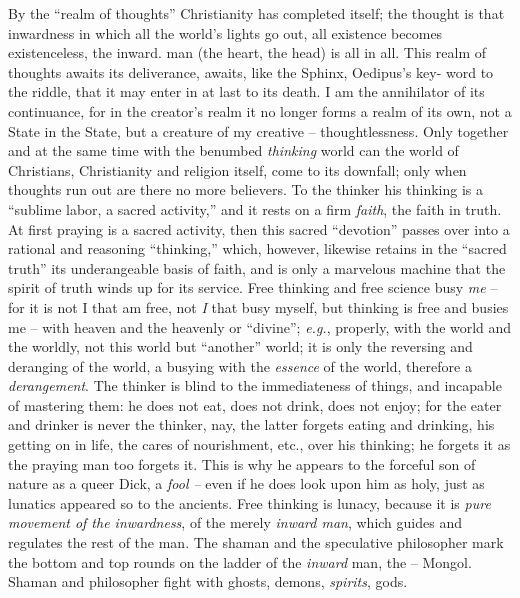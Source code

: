 \documentclass[12pt,a4paper]{book}
\begin{document}
By the ``realm of thoughts'' Christianity has completed itself; the thought 
is that inwardness in which all the world's lights go out, all existence 
becomes existenceless, the inward. man (the heart, the head) is all in all. 
This realm of thoughts awaits its deliverance, awaits, like the Sphinx, 
Oedipus's key- word to the riddle, that it may enter in at last to its death. 
I am the annihilator of its continuance, for in the creator's realm it no 
longer forms a realm of its own, not a State in the State, but a creature of 
my creative -- thoughtlessness. Only together and at the same time with the 
benumbed \textit{thinking} world can the world of Christians, Christianity and 
religion itself, come to its downfall; only when thoughts run out are there no 
more believers. To the thinker his thinking is a ``sublime labor, a sacred 
activity,'' and it rests on a firm \textit{faith}, the faith in truth. At 
first praying is a sacred activity, then this sacred ``devotion'' passes 
over into a rational and reasoning ``thinking,'' which, however, likewise 
retains in the ``sacred truth'' its underangeable basis of faith, and is 
only a marvelous machine that the spirit of truth winds up for its service. 
Free thinking and free science busy \textit{me} -- for it is not I that am 
free, not \textit{I} that busy myself, but thinking is free and busies me -- 
with heaven and the heavenly or ``divine''; \textit{e.g.}, properly, with 
the world and the worldly, not this world but ``another'' world; it is only 
the reversing and deranging of the world, a busying with the \textit{essence} 
of the world, therefore a \textit{derangement}. The thinker is blind to the 
immediateness of things, and incapable of mastering them: he does not eat, 
does not drink, does not enjoy; for the eater and drinker is never the 
thinker, nay, the latter forgets eating and drinking, his getting on in life, 
the cares of nourishment, etc., over his thinking; he forgets it as the 
praying man too forgets it. This is why he appears to the forceful son of 
nature as a queer Dick, a \textit{fool --} even if he does look upon him as 
holy, just as lunatics appeared so to the ancients. Free thinking is lunacy, 
because it is \textit{pure movement of the inwardness}, of the merely 
\textit{inward man}, which guides and regulates the rest of the man. The 
shaman and the speculative philosopher mark the bottom and top rounds on the 
ladder of the \textit{inward} man, the -- Mongol. Shaman and philosopher fight 
with ghosts, demons, \textit{spirits}, gods.
\end{document}
